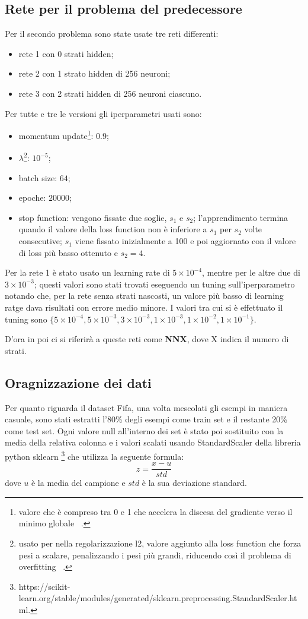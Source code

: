 \documentclass[12pt]{report}
\begin{document}
\subsection{Rete per il problema del predecessore}\label{reteAdHoc}
Per il secondo problema sono state usate tre reti differenti:
\begin{itemize}
\item{rete 1 con 0 strati hidden};
\item{rete 2 con 1 strato hidden di 256 neuroni};
\item{rete 3 con 2 strati hidden di 256 neuroni ciascuno}.
\end{itemize}

Per tutte e tre le versioni gli iperparametri usati sono:
\begin{itemize}
\item{momentum update}\footnote{valore che è compreso tra 0 e 1 che accelera la discesa del gradiente verso il minimo globale ~\cite{Momentum}.}: $0.9$;
\item{$\lambda$}\footnote{usato per nella regolarizzazione l2, valore aggiunto alla loss function che forza pesi a scalare, penalizzando i pesi più grandi, riducendo così il problema di overfitting ~\cite{L2}.}: $10^{-5}$;
\item{batch size}: $64$;
\item{epoche}: $20000$;
\item{stop function}: vengono fissate due soglie, $s_1$ e $s_2$; l'apprendimento termina quando il valore della loss function non è inferiore a $s_1$ per $s_2$ volte consecutive; $s_1$ viene fissato inizialmente a 100 e poi aggiornato con il valore di loss più basso ottenuto e $s_2 = 4$.
\end{itemize}
Per la rete 1 è stato usato un learning rate di $5 \times 10^{-4}$, mentre per le altre due di $3 \times 10^{-3}$; questi valori sono stati trovati eseguendo un tuning sull'iperparametro notando che, per la rete senza strati nascosti, un valore più basso di learning ratge dava risultati con errore medio minore. I valori tra cui si è effettuato il tuning sono $\{5 \times 10^{-4}, 5 \times 10^{-3}, 3 \times 10^{-3}, 1 \times 10^{-3}, 1 \times 10^{-2}, 1 \times 10^{-1}\}$.

D'ora in poi ci si riferirà a queste reti come \textbf{NNX}, dove X indica il numero di strati.

\subsection{Oragnizzazione dei dati}
Per quanto riguarda il dataset Fifa, una volta mescolati gli esempi in maniera casuale, sono stati estratti l'80\% degli esempi come train set e il restante 20\% come test set. Ogni valore null all’interno dei set è stato poi sostituito con la media della relativa colonna e i valori scalati usando StandardScaler della libreria python sklearn \footnote{https://scikit-learn.org/stable/modules/generated/sklearn.preprocessing.StandardScaler.html.} che utilizza la seguente formula:
\begin{equation}
z = \frac{x - u}{std}
\label{standardscaler}
\end{equation}
dove $u$ è la media del campione e $std$ è la sua deviazione standard.
\end{document}
